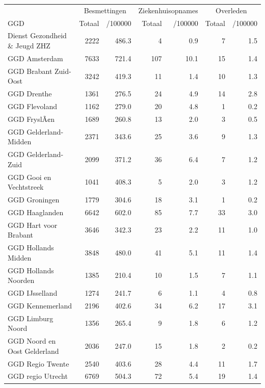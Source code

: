 \documentclass[
  english,
  man,floatsintext]{apa6}
\begin{document}
\begin{table}[H]
\centering\begingroup\fontsize{10}{12}\selectfont

\begin{threeparttable}
\begin{tabular}{lrrrrrr}
\toprule
\multicolumn{1}{c}{ } & \multicolumn{2}{c}{Besmettingen} & \multicolumn{2}{c}{Ziekenhuisopnames} & \multicolumn{2}{c}{Overleden} \\
\cmidrule(l{3pt}r{3pt}){2-3} \cmidrule(l{3pt}r{3pt}){4-5} \cmidrule(l{3pt}r{3pt}){6-7}
GGD & Totaal & /100000 & Totaal & /100000 & Totaal & /100000\\
\midrule
Dienst Gezondheid \& Jeugd ZHZ & 2222 & 486.3 & 4 & 0.9 & 7 & 1.5\\
GGD Amsterdam & 7633 & 721.4 & 107 & 10.1 & 15 & 1.4\\
GGD Brabant Zuid-Oost & 3242 & 419.3 & 11 & 1.4 & 10 & 1.3\\
GGD Drenthe & 1361 & 276.5 & 24 & 4.9 & 14 & 2.8\\
GGD Flevoland & 1162 & 279.0 & 20 & 4.8 & 1 & 0.2\\
GGD FryslÃ¢n & 1689 & 260.8 & 13 & 2.0 & 3 & 0.5\\
GGD Gelderland-Midden & 2371 & 343.6 & 25 & 3.6 & 9 & 1.3\\
GGD Gelderland-Zuid & 2099 & 371.2 & 36 & 6.4 & 7 & 1.2\\
GGD Gooi en Vechtstreek & 1041 & 408.3 & 5 & 2.0 & 3 & 1.2\\
GGD Groningen & 1779 & 304.6 & 18 & 3.1 & 1 & 0.2\\
GGD Haaglanden & 6642 & 602.0 & 85 & 7.7 & 33 & 3.0\\
GGD Hart voor Brabant & 3646 & 342.3 & 23 & 2.2 & 11 & 1.0\\
GGD Hollands Midden & 3848 & 480.0 & 41 & 5.1 & 11 & 1.4\\
GGD Hollands Noorden & 1385 & 210.4 & 10 & 1.5 & 7 & 1.1\\
GGD IJsselland & 1274 & 241.7 & 6 & 1.1 & 4 & 0.8\\
GGD Kennemerland & 2196 & 402.6 & 34 & 6.2 & 17 & 3.1\\
GGD Limburg Noord & 1356 & 265.4 & 9 & 1.8 & 6 & 1.2\\
GGD Noord en Oost Gelderland & 2036 & 247.0 & 15 & 1.8 & 2 & 0.2\\
GGD Regio Twente & 2540 & 403.6 & 28 & 4.4 & 11 & 1.7\\
GGD regio Utrecht & 6769 & 504.3 & 72 & 5.4 & 19 & 1.4\\

\end{tabular}
\end{threeparttable}
\end{table}
\end{document}
